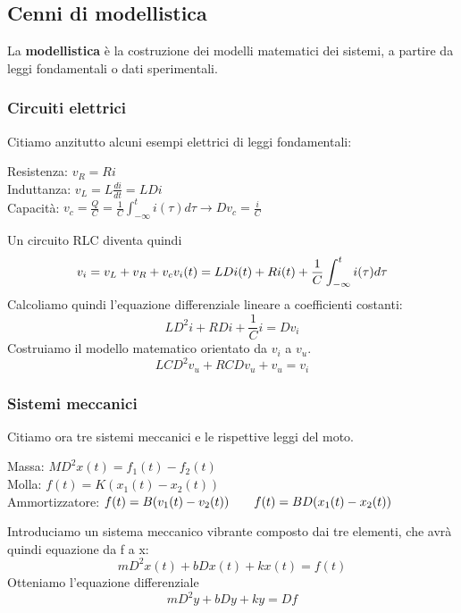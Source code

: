 \documentclass[11pt]{article}
\begin{document}
\subsection{Cenni di modellistica}
La \textbf{modellistica} è la costruzione dei modelli matematici dei sistemi, a partire da leggi fondamentali o dati sperimentali.
\subsubsection{Circuiti elettrici}
Citiamo anzitutto alcuni esempi elettrici di leggi fondamentali:\\
\begin{center}
    Resistenza: $v_R = Ri$\\
    Induttanza: $v_L=L\frac{di}{dt} = LDi$\\
    Capacità: $v_c = \frac{Q}{C} = \frac{1}{C} \int_{-\infty}^t i(\tau)d\tau \rightarrow Dv_c = \frac{i}{C}$\\
\end{center}

Un circuito RLC diventa quindi
\begin{displaymath}
    v_i=v_L+v_R+v_c\\
    v_i(t) = LDi(t) + Ri(t)+ \frac{1}{C} \int_{-\infty}^t i(\tau)d\tau
\end{displaymath}
Calcoliamo quindi l'equazione differenziale lineare a coefficienti costanti:
\begin{displaymath}
    LD^2i+RDi+\frac{1}{C}i = Dv_i
\end{displaymath}
Costruiamo il modello matematico orientato da $v_i$ a $v_u$.
\begin{displaymath}
    LCD^2 v_u + RCDv_u + v_u = v_i
\end{displaymath}
\subsubsection{Sistemi meccanici}
Citiamo ora tre sistemi meccanici e le rispettive leggi del moto.
\begin{center}
    Massa: $MD^2x(t) = f_1(t) - f_2(t)$\\
    Molla: $f(t)=K(x_1(t)-x_2(t))$\\
    Ammortizzatore: $f(t) = B(v_1(t)-v_2(t)) \hspace{20px} f(t) = BD(x_1(t)-x_2(t))$
\end{center}
Introduciamo un sistema meccanico vibrante composto dai tre elementi, che avrà quindi equazione da f a x:
\begin{displaymath}
    mD^2 x(t) + bDx(t) + kx(t) = f(t)
\end{displaymath}
Otteniamo l'equazione differenziale
\begin{displaymath}
    mD^2y+bDy+ky = Df
\end{displaymath}
\end{document}

